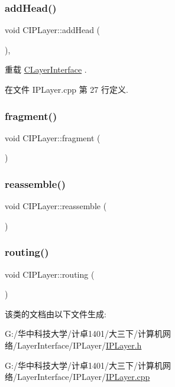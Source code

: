 \subsubsection{\texorpdfstring{add\+Head()}{addHead()}}
{\footnotesize\ttfamily void C\+I\+P\+Layer\+::add\+Head (\begin{DoxyParamCaption}{ }\end{DoxyParamCaption})\hspace{0.3cm}{\ttfamily [protected]}, {\ttfamily [virtual]}}



重载 \hyperlink{class_c_layer_interface_ac38c51660960657ac42e37a19ea062b4}{C\+Layer\+Interface} .



在文件 I\+P\+Layer.\+cpp 第 27 行定义.

\mbox{\label{class_c_i_p_layer_a85c7f675704b8605eb16e881abdcca1d}} 
\subsubsection{\texorpdfstring{fragment()}{fragment()}}
{\footnotesize\ttfamily void C\+I\+P\+Layer\+::fragment (\begin{DoxyParamCaption}{ }\end{DoxyParamCaption})}

\mbox{\label{class_c_i_p_layer_a68cfe267fa5138e11051d746540ae714}} 
\subsubsection{\texorpdfstring{reassemble()}{reassemble()}}
{\footnotesize\ttfamily void C\+I\+P\+Layer\+::reassemble (\begin{DoxyParamCaption}{ }\end{DoxyParamCaption})}

\mbox{\label{class_c_i_p_layer_afe758e9d359f9318a026ac89672b4b21}} 
\subsubsection{\texorpdfstring{routing()}{routing()}}
{\footnotesize\ttfamily void C\+I\+P\+Layer\+::routing (\begin{DoxyParamCaption}{ }\end{DoxyParamCaption})}



该类的文档由以下文件生成\+:\begin{DoxyCompactItemize}
\item 
G\+:/华中科技大学/计卓1401/大三下/计算机网络/\+Layer\+Interface/\+I\+P\+Layer/\hyperlink{_i_p_layer_8h}{I\+P\+Layer.\+h}\item 
G\+:/华中科技大学/计卓1401/大三下/计算机网络/\+Layer\+Interface/\+I\+P\+Layer/\hyperlink{_i_p_layer_8cpp}{I\+P\+Layer.\+cpp}\end{DoxyCompactItemize}
